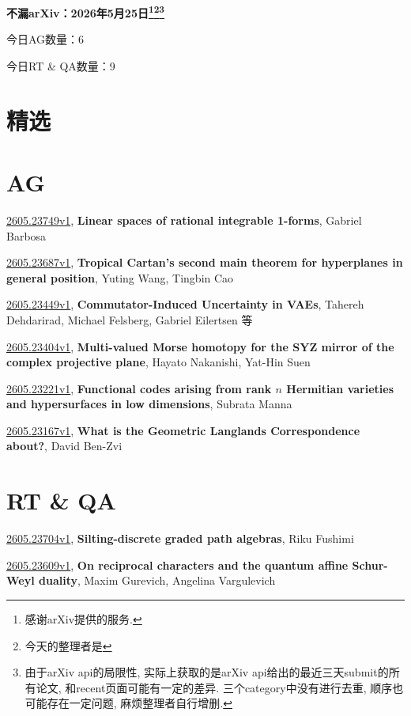 \documentclass[9pt, a4paper]{article}
\theoremstyle{plain}
\theoremstyle{definition}
\theoremstyle{remark}
\newcommand{\arxiv}[3]{\href{https://arxiv.org/abs/#1}{#1}, \textbf{\textcolor{arxivblue}{#2}}, #3}
\newcommand{\AGnumber}{6}
\newcommand{\RTQAnumber}{9}
\newcommand{\NewestDate}{2026年5月25日}
\newcommand{\todayarXiver}{} %
\begin{document}
\begin{center}
    \Huge\textbf{不漏arXiv：\NewestDate\footnote{感谢arXiv提供的服务.}\footnote{今天的整理者是\todayarXiver}\footnote{由于arXiv api的局限性, 实际上获取的是arXiv api给出的最近三天submit的所有论文, 和recent页面可能有一定的差异. 三个category中没有进行去重, 顺序也可能存在一定问题, 麻烦整理者自行增删.}} \\
\end{center}

\setcounter{section}{-1}

\begin{center}
    今日AG数量：\AGnumber
    
    今日RT \& QA数量：\RTQAnumber
    
\end{center}


\section{精选}


\section{AG}
\arxiv{2605.23749v1}{Linear spaces of rational integrable 1-forms}{Gabriel Barbosa}

\arxiv{2605.23687v1}{Tropical Cartan's second main theorem for hyperplanes in general position}{Yuting Wang, Tingbin Cao}

\arxiv{2605.23449v1}{Commutator-Induced Uncertainty in VAEs}{Tahereh Dehdarirad, Michael Felsberg, Gabriel Eilertsen 等}

\arxiv{2605.23404v1}{Multi-valued Morse homotopy for the SYZ mirror of the complex projective plane}{Hayato Nakanishi, Yat-Hin Suen}

\arxiv{2605.23221v1}{Functional codes arising from rank $n$ Hermitian varieties and hypersurfaces in low dimensions}{Subrata Manna}

\arxiv{2605.23167v1}{What is the Geometric Langlands Correspondence about?}{David Ben-Zvi}


\section{RT \& QA}
\arxiv{2605.23704v1}{Silting-discrete graded path algebras}{Riku Fushimi}

\arxiv{2605.23609v1}{On reciprocal characters and the quantum affine Schur-Weyl duality}{Maxim Gurevich, Angelina Vargulevich}
\end{document}
